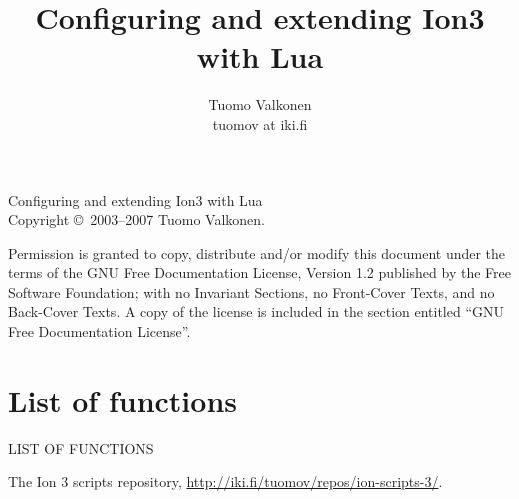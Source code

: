 \documentclass[english,a4paper,11pt,oldtoc,mctitle]{rapport3}
\title{Configuring and extending Ion3 with Lua}
\author{Tuomo Valkonen \\ tuomov at iki.fi}
\begin{document}
\maketitle

Configuring and extending Ion3 with Lua\\
Copyright \copyright\  2003--2007 Tuomo Valkonen.

Permission is granted to copy, distribute and/or modify this document
under the terms of the GNU Free Documentation License, Version 1.2
published by the Free Software Foundation;
with no Invariant Sections, no Front-Cover Texts, and no Back-Cover Texts.
A copy of the license is included in the section entitled ``GNU
Free Documentation License''.

\tableofcontents













\appendix





\chapter*{List of functions}
%
         {\MakeUppercase{List of functions}}%

\makeatletter
\def\fnlisti#1{\@dottedtocline{1}{0em}{1.5em}{\lstinline!#1!}{\pageref{fn:#1}}}
{\parskip\z@}
\makeatother

\begin{htmlonly}
\newcommand{\fnlisti}[1]{\fnref{#1}\\}

\end{htmlonly}

\printindex

\begin{thebibliography}{9}
     The Ion 3 scripts repository,
        \url{http://iki.fi/tuomov/repos/ion-scripts-3/}.
\end{thebibliography}
\end{document}
